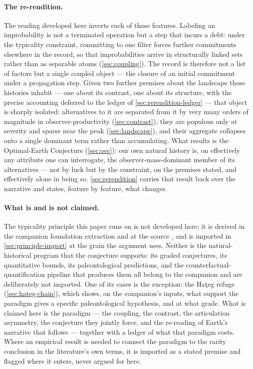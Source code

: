 \documentclass[11pt]{article}
\theoremstyle{definition}
\begin{document}
\paragraph{The re-rendition.} The reading developed here inverts each of those features. Labeling an improbability is not a terminated operation but a step that incurs a debt: under the typicality constraint, committing to one filter forces further commitments elsewhere in the record, so that improbabilities arrive in structurally linked sets rather than as separable atoms (\autoref{sec:coupling}). The record is therefore not a list of factors but a single coupled object --- the closure of an initial commitment under a propagation step. Given two further premises about the landscape those histories inhabit --- one about its contrast, one about its structure, with the precise accounting deferred to the ledger of \autoref{sec:rerendition-ledger} --- that object is sharply isolated: alternatives to it are separated from it by very many orders of magnitude in observer-productivity (\autoref{sec:contrast}), they are populous only at severity and sparse near the peak (\autoref{sec:landscape}), and their aggregate collapses onto a single dominant term rather than accumulating. What results is the Optimal-Earth Conjecture (\autoref{sec:oec}): our own natural history is, on effectively any attribute one can interrogate, the observer-mass-dominant member of its alternatives --- not by luck but by the constraint, on the premises stated, and effectively alone in being so. \autoref{sec:rerendition} carries that result back over the narrative and states, feature by feature, what changes.



\paragraph{What is and is not claimed.} The typicality principle this paper runs on is not developed here; it is derived in the companion foundation extraction \cite{NexicFoundation} and at the source \cite{Nexus}, and is imported in \autoref{sec:principle-import} at the grain the argument uses. Neither is the natural-historical program that the conjecture supports: its graded conjectures, its quantitative bounds, its paleontological predictions, and the counterfactual-quantification pipeline that produces them all belong to the companion \cite{Nexus} and are deliberately not imported. One of its cases is the exception: the Ha\c{t}eg refuge (\autoref{sec:hateg-chain}), which shows, on the companion's inputs, what support the paradigm gives a specific paleontological hypothesis, and at what grade. What is claimed here is the paradigm --- the coupling, the contrast, the articulation asymmetry, the conjecture they jointly force, and the re-reading of Earth's narrative that follows --- together with a ledger of what that paradigm costs. Where an empirical result is needed to connect the paradigm to the rarity conclusion in the literature's own terms, it is imported as a stated premise and flagged where it enters, never argued for here.
\end{document}
